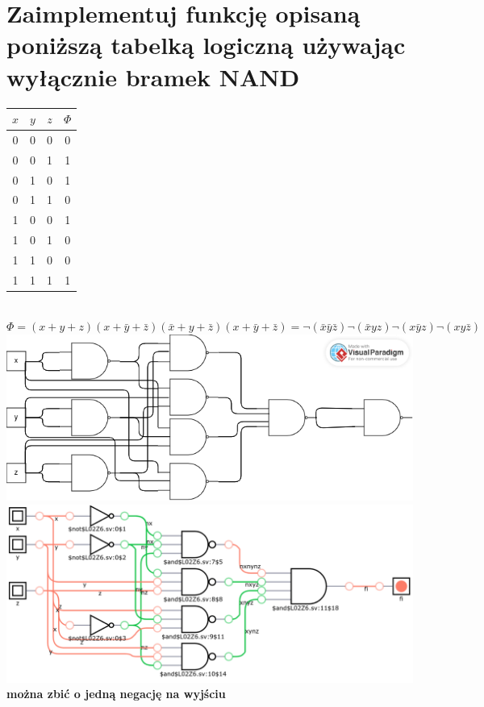 \documentclass{article}
\begin{document}
\section{Zaimplementuj funkcję opisaną poniższą tabelką logiczną używając wyłącznie bramek NAND}
\begin{center}
	\begin{tabular}{|c|c|c||c|} 
	 \hline
	$x$ & $y$ & $z$ & $\Phi$\\ 
	 \hline \hline
	 0&0&0&0\\ \hline
	 0&0&1&1\\ \hline
	 0&1&0&1\\ \hline
	 0&1&1&0\\ \hline
	 1&0&0&1\\ \hline	 
	 1&0&1&0\\ \hline
	 1&1&0&0\\ \hline
	 1&1&1&1\\ \hline
	\end{tabular}\\
	$\Phi = (x+y+z)(x+\bar y + \bar z)(\bar x+y+\bar z)(x+\bar y+\bar z) = \neg{(\bar x \bar y \bar z)} \neg{( \bar x y  z)} \neg{( x \bar y z)} \neg{(x  y \bar z)}$\\
	\includegraphics[scale=0.3]{./L02Z06.png}
	\includegraphics[scale=0.3]{./L02Z06czII.png}\\
	\textbf{można zbić o jedną negację na wyjściu}
\end{center}
\end{document}
